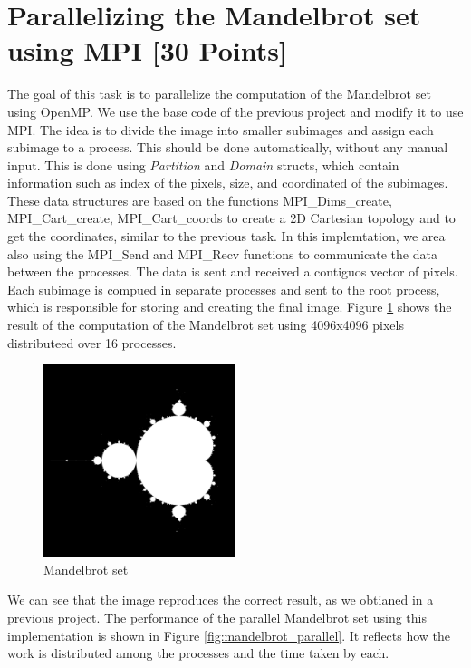 \documentclass[unicode,11pt,a4paper,oneside,numbers=endperiod,openany]{scrartcl}
\begin{document}
\section{Parallelizing the Mandelbrot set using MPI [30 Points]}
The goal of this task is to parallelize the computation of the Mandelbrot set
using OpenMP. We use the base code of the previous project and modify it to use
MPI. The idea is to divide the image into smaller subimages and assign each
subimage to a process. This should be done automatically, without any manual
input. This is done using \textit{Partition} and \textit{Domain} structs, which
contain information such as index
of the pixels, size, and coordinated of the subimages.
These data structures are based on the functions MPI\_Dims\_create, MPI\_Cart\_create,
MPI\_Cart\_coords to create a 2D Cartesian topology and to get the coordinates,
similar to the previous task. 
In this implemtation, we area also using the MPI\_Send and MPI\_Recv functions
to communicate the data between the processes. The data is sent and received a
contiguos vector of pixels. Each subimage is compued in separate processes and
sent to the root process, which is responsible for storing and creating the final image.
Figure \ref{fig:mandelbrot} shows the result of the computation of the
Mandelbrot set using 4096x4096 pixels distributeed over 16 processes. 
\begin{figure}[h!]
    \centering
    \includegraphics[width=0.5\textwidth]{../mandel/mandel.png}
    \caption{Mandelbrot set}
    \label{fig:mandelbrot}
\end{figure}
We can see that the image reproduces the correct result, as we obtianed in a previous project. 
The performance
of the parallel Mandelbrot set using this implementation is shown in Figure \ref{fig:mandelbrot_parallel}.
It reflects how the work is distributed among the processes and the time taken
by each. 
\end{document}
